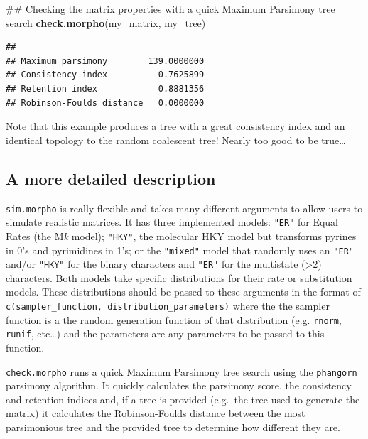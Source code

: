 \documentclass[]{book}
\newenvironment{Shaded}{\begin{snugshade}}{\end{snugshade}}
\newcommand{\KeywordTok}[1]{\textcolor[rgb]{0.13,0.29,0.53}{\textbf{#1}}}
\newcommand{\NormalTok}[1]{#1}
\theoremstyle{definition}
\theoremstyle{definition}
\theoremstyle{remark}
\begin{document}
\begin{Shaded}
\begin{Highlighting}[]
\NormalTok{## Checking the matrix properties with a quick Maximum Parsimony tree search}
\KeywordTok{check.morpho}\NormalTok{(my_matrix, my_tree)}
\end{Highlighting}
\end{Shaded}

\begin{verbatim}
##                                     
## Maximum parsimony        139.0000000
## Consistency index          0.7625899
## Retention index            0.8881356
## Robinson-Foulds distance   0.0000000
\end{verbatim}

Note that this example produces a tree with a great consistency index
and an identical topology to the random coalescent tree! Nearly too good
to be true\ldots{}

\subsection{A more detailed
description}\label{a-more-detailed-description}

\texttt{sim.morpho} is really flexible and takes many different
arguments to allow users to simulate realistic matrices. It has three
implemented models: \texttt{"ER"} for Equal Rates (the M\emph{k} model);
\texttt{"HKY"}, the molecular HKY model but transforms pyrines in 0's
and pyrimidines in 1's; or the \texttt{"mixed"} model that randomly uses
an \texttt{"ER"} and/or \texttt{"HKY"} for the binary characters and
\texttt{"ER"} for the multistate (\textgreater{}2) characters. Both
models take specific distributions for their rate or substitution
models. These distributions should be passed to these arguments in the
format of \texttt{c(sampler\_function,\ distribution\_parameters)} where
the the sampler function is a the random generation function of that
distribution (e.g. \texttt{rnorm}, \texttt{runif}, etc\ldots{}) and the
parameters are any parameters to be passed to this function.

\texttt{check.morpho} runs a quick Maximum Parsimony tree search using
the \texttt{phangorn} parsimony algorithm. It quickly calculates the
parsimony score, the consistency and retention indices and, if a tree is
provided (e.g.~the tree used to generate the matrix) it calculates the
Robinson-Foulds distance between the most parsimonious tree and the
provided tree to determine how different they are.
\end{document}
